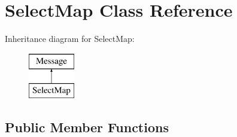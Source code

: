 \hypertarget{class_select_map}{\section{Select\-Map Class Reference}
\label{class_select_map}
}
Inheritance diagram for Select\-Map\-:\begin{figure}[H]
\begin{center}
\leavevmode
\includegraphics[height=2.000000cm]{class_select_map}
\end{center}
\end{figure}
\subsection*{Public Member Functions}
